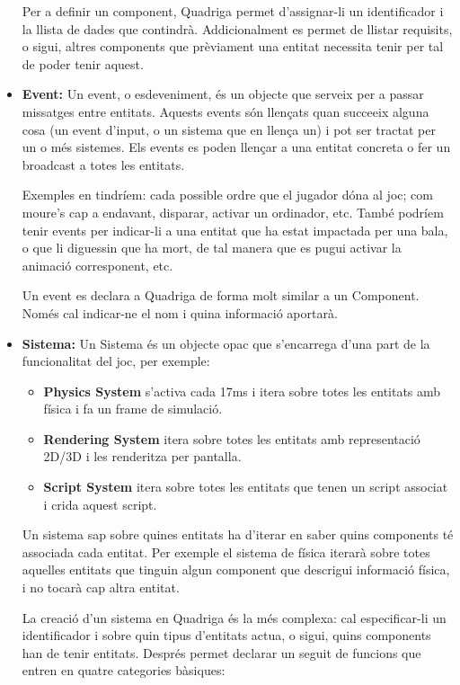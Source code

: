 \begin{itemize}
      Per a definir un component, Quadriga permet d'assignar-li un identificador i la llista de dades que contindrà. Addicionalment es permet de llistar requisits, o sigui, altres components que prèviament una entitat necessita tenir per tal de poder tenir aquest.
      
    \item{\bf Event:}
      Un event, o esdeveniment, és un objecte que serveix per a passar missatges entre entitats. Aquests events són llençats quan succeeix alguna cosa (un event d'input, o un sistema que en llença un) i pot ser tractat per un o més sistemes. Els events es poden llençar a una entitat concreta o fer un broadcast a totes les entitats.
      
      Exemples en tindríem: cada possible ordre que el jugador dóna al joc; com moure's cap a endavant, disparar, activar un ordinador, etc. També podríem tenir events per indicar-li a una entitat que ha estat impactada per una bala, o que li diguessin que ha mort, de tal manera que es pugui activar la animació corresponent, etc.

      Un event es declara a Quadriga de forma molt similar a un Component. Només cal indicar-ne el nom i quina informació aportarà.

    \item{\bf Sistema:}
      Un Sistema és un objecte opac que s'encarrega d'una part de la funcionalitat del joc, per exemple:
      \begin{itemize}
        \item{\bf Physics System} s'activa cada 17ms i itera sobre totes les entitats amb física i fa un frame de simulació.
        \item{\bf Rendering System} itera sobre totes les entitats amb representació 2D/3D i les renderitza per pantalla.
        \item{\bf Script System} itera sobre totes les entitats que tenen un script associat i crida aquest script.
      \end{itemize}

      Un sistema sap sobre quines entitats ha d'iterar en saber quins components té associada cada entitat. Per exemple el sistema de física iterarà sobre totes aquelles entitats que tinguin algun component que descrigui informació física, i no tocarà cap altra entitat.

      La creació d'un sistema en Quadriga és la més complexa: cal especificar-li un identificador i sobre quin tipus d'entitats actua, o sigui, quins components han de tenir entitats. Després permet declarar un seguit de funcions que entren en quatre categories bàsiques:
      

\end{itemize}
